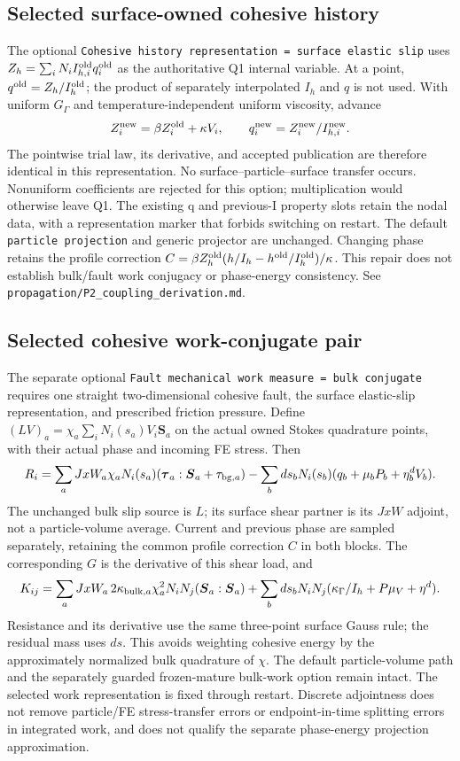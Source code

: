 \documentclass[11pt]{article}
\begin{document}
\subsection{Selected surface-owned cohesive history}
The optional \texttt{Cohesive history representation = surface elastic slip}
uses $Z_h=\sum_i N_i I_{h,i}^{\rm old}q_i^{\rm old}$ as the authoritative
Q1 internal variable. At a point, $q^{\rm old}=Z_h/I_h^{\rm old}$; the product
of separately interpolated $I_h$ and $q$ is not used. With uniform $G_\Gamma$
and temperature-independent uniform viscosity, advance
\[
 Z_i^{\rm new}=\beta Z_i^{\rm old}+\kappa V_i,\qquad
 q_i^{\rm new}=Z_i^{\rm new}/I_{h,i}^{\rm new}.
\]
The pointwise trial law, its derivative, and accepted publication are therefore
identical in this representation. No surface--particle--surface transfer occurs.
Nonuniform coefficients are rejected for this option; multiplication would
otherwise leave Q1. The existing q and previous-I property slots retain the
nodal data, with a representation marker that forbids switching on restart.
The default \texttt{particle projection} and generic projector are unchanged.
Changing phase retains the profile correction
$C=\beta Z_h^{\rm old}(h/I_h-h^{\rm old}/I_h^{\rm old})/\kappa$.
This repair does not establish bulk/fault work conjugacy or phase-energy
consistency. See \texttt{propagation/P2\_coupling\_derivation.md}.

\subsection{Selected cohesive work-conjugate pair}
The separate optional \texttt{Fault mechanical work measure = bulk conjugate}
requires one straight two-dimensional cohesive fault, the surface elastic-slip
representation, and prescribed friction pressure. Define
$(LV)_a=\chi_a\sum_iN_i(s_a)V_i\boldsymbol S_a$ on the actual owned Stokes
quadrature points, with their actual phase and incoming FE stress. Then
\[
 R_i=\sum_a JxW_a\chi_aN_i(s_a)(\boldsymbol\tau_a:\boldsymbol S_a+
 \tau_{{\rm bg},a})-
 \sum_b ds_bN_i(s_b)(q_b+\mu_bP_b+\eta^d_bV_b).
\]
The unchanged bulk slip source is $L$; its surface shear partner is its
$JxW$ adjoint, not a particle-volume average. Current and previous phase are
sampled separately, retaining the common profile correction $C$ in both blocks.
The corresponding $G$ is the derivative of this shear load, and
\[
 K_{ij}=\sum_a JxW_a\,2\kappa_{{\rm bulk},a}\chi_a^2N_iN_j
 (\boldsymbol S_a:\boldsymbol S_a)
 +\sum_b ds_bN_iN_j(\kappa_\Gamma/I_h+P\mu_V+\eta^d).
\]
Resistance and its derivative use the same three-point surface Gauss rule;
the residual mass uses $ds$. This avoids weighting cohesive energy by the
approximately normalized bulk quadrature of $\chi$. The default particle-volume
path and the separately guarded frozen-mature bulk-work option remain intact.
The selected work representation is fixed through restart. Discrete adjointness
does not remove particle/FE stress-transfer errors or endpoint-in-time splitting
errors in integrated work, and does not qualify the separate phase-energy
projection approximation.
\end{document}
